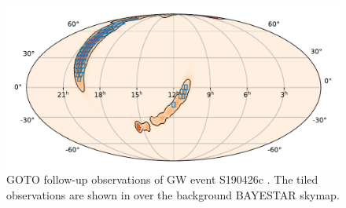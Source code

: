 \begin{colsection}
\begin{colsection}
\begin{figure}[p]
    \begin{center}
        \includegraphics[width=0.9\linewidth]{images/190426_goto.pdf}
    \end{center}
    \caption[Follow-up observations of S190426c with GOTO]{
        GOTO follow-up observations of GW event S190426c \citep{S190426c_GOTO}. The tiled observations are shown in  over the background BAYESTAR skymap.
        }\label{fig:190426_goto}
\end{figure}

\clearpage

\end{colsection}


\end{colsection}


\newpage
